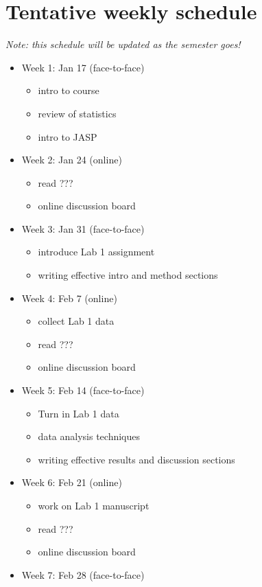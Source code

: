 \documentclass[10pt]{article}
\begin{document}
\section*{Tentative weekly schedule}
\label{sec-11}
\emph{Note: this schedule will be updated as the semester goes!}
\begin{itemize}
\item Week 1: Jan 17 (face-to-face)
\begin{itemize}
\item intro to course
\item review of statistics
\item intro to JASP
\end{itemize}
\item Week 2: Jan 24 (online)
\begin{itemize}
\item read ???
\item online discussion board
\end{itemize}
\item Week 3: Jan 31 (face-to-face)
\begin{itemize}
\item introduce Lab 1 assignment
\item writing effective intro and method sections
\end{itemize}
\item Week 4: Feb 7 (online)
\begin{itemize}
\item collect Lab 1 data
\item read ???
\item online discussion board
\end{itemize}
\item Week 5: Feb 14 (face-to-face)
\begin{itemize}
\item Turn in Lab 1 data
\item data analysis techniques
\item writing effective results and discussion sections
\end{itemize}
\item Week 6: Feb 21 (online)
\begin{itemize}
\item work on Lab 1 manuscript
\item read ???
\item online discussion board
\end{itemize}
\item Week 7: Feb 28 (face-to-face)

\end{itemize}
\end{document}
